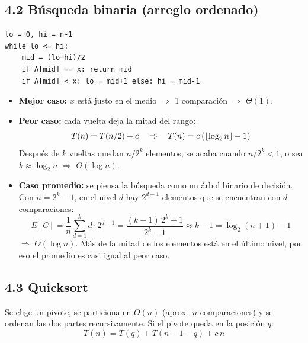 \documentclass[11pt]{article}
\DeclarePairedDelimiter{\floor}{\lfloor}{\rfloor}
\newcommand{\res}[1]{\textcolor{azul}{\textbf{#1}}}
\begin{document}
\subsection*{4.2 Búsqueda binaria (arreglo ordenado)}

\begin{lstlisting}
lo = 0, hi = n-1
while lo <= hi:
    mid = (lo+hi)/2
    if A[mid] == x: return mid
    if A[mid] < x: lo = mid+1 else: hi = mid-1
\end{lstlisting}

\begin{itemize}
  \item \textbf{Mejor caso:} $x$ está justo en el medio $\Rightarrow$ 1 comparación
        $\Rightarrow$ \res{$\Theta(1)$}.
  \item \textbf{Peor caso:} cada vuelta deja la mitad del rango:
        \[
          T(n) = T(n/2) + c \quad\Rightarrow\quad T(n) = c\,\bigl(\floor{\log_2 n} + 1\bigr)
        \]
        Después de $k$ vueltas quedan $n/2^k$ elementos; se acaba cuando $n/2^k < 1$, o sea
        $k \approx \log_2 n$ $\Rightarrow$ \res{$\Theta(\log n)$}.
  \item \textbf{Caso promedio:} se piensa la búsqueda como un árbol binario de decisión. Con
        $n = 2^k - 1$, en el nivel $d$ hay $2^{d-1}$ elementos que se encuentran con $d$
        comparaciones:
        \[
          E[C] = \frac{1}{n}\sum_{d=1}^{k} d\cdot 2^{d-1}
               = \frac{(k-1)\,2^k + 1}{2^k - 1}
               \approx k - 1 = \log_2(n+1) - 1
        \]
        $\Rightarrow$ \res{$\Theta(\log n)$}. Más de la mitad de los elementos está en el
        último nivel, por eso el promedio es casi igual al peor caso.
\end{itemize}

\subsection*{4.3 Quicksort}

Se elige un pivote, se particiona en $O(n)$ (aprox.\ $n$ comparaciones) y se ordenan las dos
partes recursivamente. Si el pivote queda en la posición $q$:
\[
  T(n) = T(q) + T(n - 1 - q) + c\,n
\]
\end{document}
